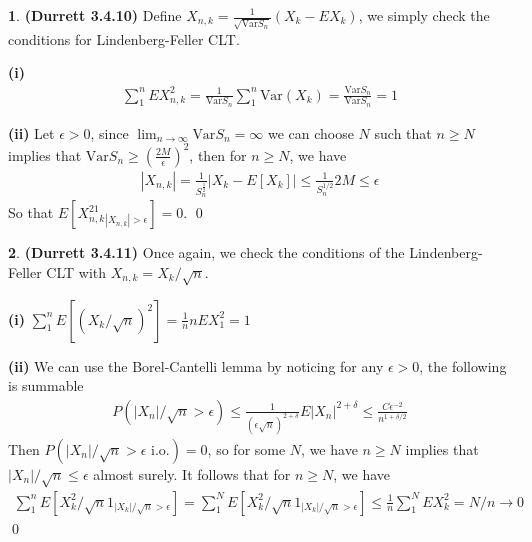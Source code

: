 \documentclass{article}
\theoremstyle{definition}
\newtheorem{pb}{}
\newcommand{\abs}[1]{\left\vert#1\right\vert}
\newcommand{\var}{\text{Var}}
\begin{document}
    \begin{pb}\textbf{(Durrett 3.4.10)}
        Define \(X_{n,k} = \frac{1}{\sqrt{\var S_n}}(X_k - EX_k)\), we simply check the conditions for Lindenberg-Feller CLT.
        
        \textbf{(i)}
        \begin{align*}
            \sum_1^n EX_{n,k}^2 = \frac{1}{\var S_n}\sum_1^n \var(X_k) = \frac{\var S_n}{\var S_n} = 1
        \end{align*}

        \textbf{(ii)}
        Let \(\epsilon > 0\), since \(\lim_{n\to\infty}\var S_n = \infty\) we can choose \(N\) such that \(n \geq N\) implies that \(\var S_n \geq \left(\frac{2M}{\epsilon}\right)^2\), then for \(n \geq N\), we have
        \begin{align*}
            \abs{X_{n,k}} = \frac{1}{S_n^{\frac12}}\abs{X_k - E[X_k]} \leq \frac{1}{S_n^{1/2}}2M \leq \epsilon
        \end{align*}
        So that \(E[X_{n,k}^21_{\abs{X_{n,k}} > \epsilon}] = 0\). \qed
    \end{pb}
    \begin{pb}\textbf{(Durrett 3.4.11)}
        Once again, we check the conditions of the Lindenberg-Feller CLT with \(X_{n,k} = X_k/\sqrt{n}\).

        \textbf{(i)} \(\sum_1^n E[(X_k/\sqrt{n})^2] = \frac{1}{n}nEX_1^2 = 1\)

        \textbf{(ii)} We can use the Borel-Cantelli lemma by noticing for any \(\epsilon > 0\), the following is summable
        \begin{align*}
            P(\abs{X_n}/\sqrt{n} > \epsilon) \leq \frac{1}{(\epsilon\sqrt{n})^{2+\delta}}E\abs{X_n}^{2+\delta} \leq \frac{C \epsilon^{-2}}{n^{1+\delta/2}}
        \end{align*}
        Then \(P(\abs{X_n}/\sqrt{n} > \epsilon \text{ i.o.}) = 0\), so for some \(N\), we have \(n \geq N\) implies that \(\abs{X_n}/\sqrt{n} \leq \epsilon\) almost surely. It follows that for \(n \geq N\), we have
        \begin{align*}
            \sum_1^n E[X_k^2/\sqrt{n}1_{\abs{X_k}/\sqrt{n}>\epsilon}] = \sum_1^N E[X_k^2/\sqrt{n}1_{\abs{X_k}/\sqrt{n}>\epsilon}] \leq \frac{1}{n}\sum_1^N EX_k^2 = N/n \to 0
        \end{align*} \qed
    \end{pb}
\end{document}
